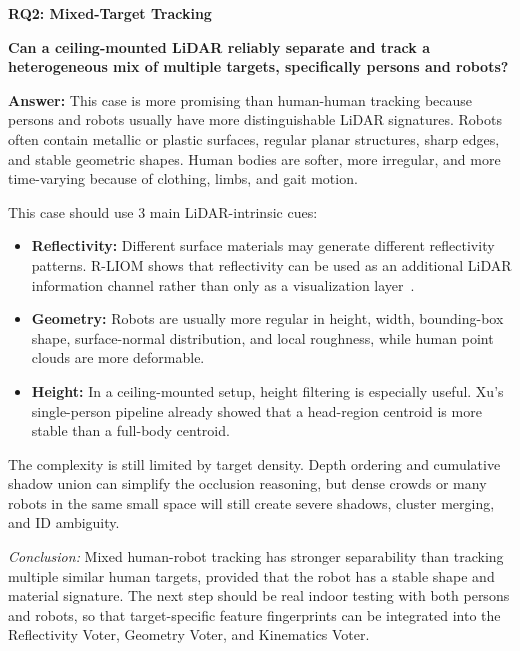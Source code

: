 \documentclass[11pt,a4paper]{report}
\newcommand{\boxitemtitle}[1]{
    \vspace{0.5em}
    {\large\textbf{\color{DeepBlue} #1}}\par
    \vspace{0.8em}
}
\begin{document}
\boxitemtitle{RQ2: Mixed-Target Tracking}
\begin{contentbox}
\textbf{Can a ceiling-mounted LiDAR reliably separate and track a heterogeneous mix of multiple targets, specifically persons and robots?}

\vspace{0.8em}
\textbf{Answer:} This case is more promising than human-human tracking because persons and robots usually have more distinguishable LiDAR signatures. Robots often contain metallic or plastic surfaces, regular planar structures, sharp edges, and stable geometric shapes. Human bodies are softer, more irregular, and more time-varying because of clothing, limbs, and gait motion.

\vspace{0.6em}
This case should use 3 main LiDAR-intrinsic cues:
\begin{itemize}[leftmargin=*]
    \item \textbf{Reflectivity:} Different surface materials may generate different reflectivity patterns. R-LIOM shows that reflectivity can be used as an additional LiDAR information channel rather than only as a visualization layer~\cite{dong2023rliom}.
    \item \textbf{Geometry:} Robots are usually more regular in height, width, bounding-box shape, surface-normal distribution, and local roughness, while human point clouds are more deformable.
    \item \textbf{Height:} In a ceiling-mounted setup, height filtering is especially useful. Xu's single-person pipeline already showed that a head-region centroid is more stable than a full-body centroid.
\end{itemize}

\vspace{0em}
The complexity is still limited by target density. Depth ordering and cumulative shadow union can simplify the occlusion reasoning, but dense crowds or many robots in the same small space will still create severe shadows, cluster merging, and ID ambiguity.

\vspace{0.6em}
\textit{Conclusion:} Mixed human-robot tracking has stronger separability than tracking multiple similar human targets, provided that the robot has a stable shape and material signature. The next step should be real indoor testing with both persons and robots, so that target-specific feature fingerprints can be integrated into the Reflectivity Voter, Geometry Voter, and Kinematics Voter.
\end{contentbox}
\end{document}
